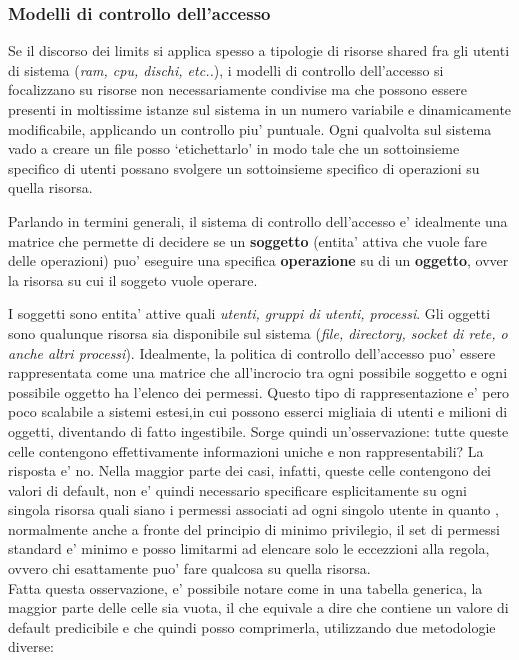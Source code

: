 \subsubsection{Modelli di controllo dell'accesso}
Se il discorso dei limits si applica spesso a tipologie di risorse shared fra gli utenti di sistema (\emph{ram, cpu, dischi, etc..}), i modelli di controllo dell'accesso si focalizzano su risorse non necessariamente condivise ma che possono essere presenti in moltissime istanze sul sistema in un numero variabile e dinamicamente modificabile, applicando un controllo piu' puntuale. Ogni qualvolta sul sistema vado a creare un file posso `etichettarlo' in modo tale che un sottoinsieme specifico di utenti possano svolgere un sottoinsieme specifico di operazioni su quella risorsa. 
\begin{center}
	Parlando in termini generali, il sistema di controllo dell'accesso e' idealmente una matrice che permette di decidere se un \textbf{soggetto} (entita' attiva che vuole fare delle operazioni) puo' eseguire una specifica \textbf{operazione} su di un \textbf{oggetto}, ovver la risorsa su cui il soggeto vuole operare.
\end{center}
I soggetti sono entita' attive quali \emph{utenti, gruppi di utenti, processi}. Gli oggetti sono qualunque risorsa sia disponibile sul sistema (\emph{file, directory, socket di rete, o anche altri processi}). 
Idealmente, la politica di controllo dell'accesso puo' essere rappresentata come una matrice che all'incrocio tra ogni possibile soggetto e ogni possibile oggetto ha l'elenco dei permessi. Questo tipo di rappresentazione e' pero poco scalabile a sistemi estesi,in cui possono esserci migliaia di utenti e milioni di oggetti, diventando di fatto ingestibile. Sorge quindi un'osservazione: tutte queste celle contengono effettivamente informazioni uniche e non rappresentabili? La risposta e' no. Nella maggior parte dei casi, infatti, queste celle contengono dei valori di default, non e' quindi necessario specificare esplicitamente su ogni singola risorsa quali siano i permessi associati ad ogni singolo utente in quanto , normalmente anche a fronte del principio di minimo privilegio, il set di permessi standard e' minimo e posso limitarmi ad elencare solo le eccezzioni alla regola, ovvero chi esattamente puo' fare qualcosa su quella risorsa. \\
Fatta questa osservazione, e' possibile notare come in una tabella generica, la maggior parte delle celle sia vuota, il che equivale a dire che contiene un valore di default predicibile e che quindi posso comprimerla, utilizzando due metodologie diverse:
